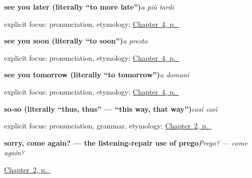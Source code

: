 \noindent\begin{minipage}[t]{\linewidth}
\raggedright
\textbf{see you later (literally \textquotedblleft{}to more late\textquotedblright{})}\enspace\emph{a più tardi}\par
\footnotesize explicit focus: pronunciation, etymology; \hyperref[ch:it-farewells]{Chapter~4, p.~\pageref*{ch:it-farewells}}
\end{minipage}\par\smallskip

\noindent\begin{minipage}[t]{\linewidth}
\raggedright
\textbf{see you soon (literally \textquotedblleft{}to soon\textquotedblright{})}\enspace\emph{a presto}\par
\footnotesize explicit focus: pronunciation, etymology; \hyperref[ch:it-farewells]{Chapter~4, p.~\pageref*{ch:it-farewells}}
\end{minipage}\par\smallskip

\noindent\begin{minipage}[t]{\linewidth}
\raggedright
\textbf{see you tomorrow (literally \textquotedblleft{}to tomorrow\textquotedblright{})}\enspace\emph{a domani}\par
\footnotesize explicit focus: pronunciation, etymology; \hyperref[ch:it-farewells]{Chapter~4, p.~\pageref*{ch:it-farewells}}
\end{minipage}\par\smallskip

\noindent\begin{minipage}[t]{\linewidth}
\raggedright
\textbf{so-so (literally \textquotedblleft{}thus, thus\textquotedblright{} — \textquotedblleft{}this way, that way\textquotedblright{})}\enspace\emph{così così}\par
\footnotesize explicit focus: pronunciation, grammar, etymology; \hyperref[ch:it-how-are-you]{Chapter~2, p.~\pageref*{ch:it-how-are-you}}
\end{minipage}\par\smallskip

\noindent\begin{minipage}[t]{\linewidth}
\raggedright
\textbf{sorry, come again? — the listening-repair use of prego}\enspace\emph{Prego? — come again?}\par
\footnotesize \hyperref[ch:it-how-are-you]{Chapter~2, p.~\pageref*{ch:it-how-are-you}}
\end{minipage}\par\smallskip

